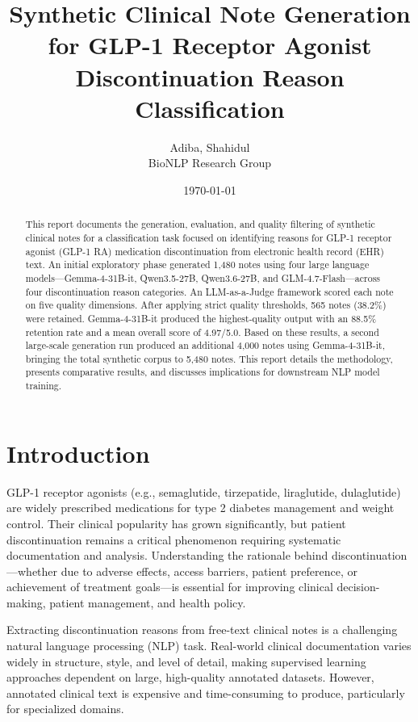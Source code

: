 \documentclass[11pt, a4paper]{article}
\title{\textbf{Synthetic Clinical Note Generation for GLP-1 Receptor Agonist Discontinuation Reason Classification}}
\author{Adiba, Shahidul \\ BioNLP Research Group}
\date{\today}
\begin{document}
\maketitle

\begin{abstract}
This report documents the generation, evaluation, and quality filtering of synthetic clinical notes for a classification task focused on identifying reasons for GLP-1 receptor agonist (GLP-1 RA) medication discontinuation from electronic health record (EHR) text. An initial exploratory phase generated 1,480 notes using four large language models---Gemma-4-31B-it, Qwen3.5-27B, Qwen3.6-27B, and GLM-4.7-Flash---across four discontinuation reason categories. An LLM-as-a-Judge framework scored each note on five quality dimensions. After applying strict quality thresholds, 565 notes (38.2\%) were retained. Gemma-4-31B-it produced the highest-quality output with an 88.5\% retention rate and a mean overall score of 4.97/5.0. Based on these results, a second large-scale generation run produced an additional 4,000 notes using Gemma-4-31B-it, bringing the total synthetic corpus to 5,480 notes. This report details the methodology, presents comparative results, and discusses implications for downstream NLP model training.
\end{abstract}

\section{Introduction}

GLP-1 receptor agonists (e.g., semaglutide, tirzepatide, liraglutide, dulaglutide) are widely prescribed medications for type 2 diabetes management and weight control. Their clinical popularity has grown significantly, but patient discontinuation remains a critical phenomenon requiring systematic documentation and analysis. Understanding the rationale behind discontinuation---whether due to adverse effects, access barriers, patient preference, or achievement of treatment goals---is essential for improving clinical decision-making, patient management, and health policy.

Extracting discontinuation reasons from free-text clinical notes is a challenging natural language processing (NLP) task. Real-world clinical documentation varies widely in structure, style, and level of detail, making supervised learning approaches dependent on large, high-quality annotated datasets. However, annotated clinical text is expensive and time-consuming to produce, particularly for specialized domains.
\end{document}
